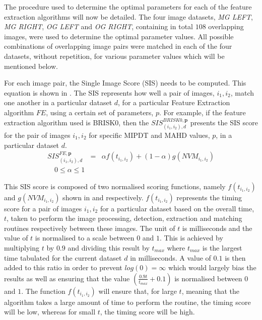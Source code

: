 \documentclass[11pt]{report}
\begin{document}
The procedure used to determine the optimal parameters for each of the feature extraction algorithms will now be detailed. The four image datasets, \textit{MG LEFT}, \textit{MG RIGHT}, \textit{OG LEFT} and \textit{OG RIGHT}, containing in total $108$ overlapping images, were used to determine the optimal parameter values. All possible combinations of overlapping image pairs were matched in each of the four datasets, without repetition, for various parameter values which will be mentioned below. 

For each image pair, the Single Image Score (SIS) needs to be computed. This equation is shown in . The SIS represents how well a pair of images, $i_1, i_2$, match one another in a particular dataset $d$, for a particular Feature Extraction algorithm $FE$, using a certain set of parameters, $p$. For example, if the feature extraction algorithm used is BRISK0, then the $SIS_{(i_1, i_2), d}^{BRISK0, \textbf{p}}$ presents the SIS score for the pair of images $i_1, i_2$ for specific MIPDT and MAHD values, $p$, in a particular dataset $d$. \\

\begin{eqnarray}
SIS_{(i_1, i_2), d}^{FE, \textbf{p}} &=& \alpha f(t_{i_1,i_2}) + (1-\alpha) g(\textit{NVM}_{i_1,i_2})\\ 
\quad 0 \leq \alpha \leq 1 
\label{eqn:optimalParameters}
\end{eqnarray}

This SIS score is composed of two normalised scoring functions, namely $f(t_{i_1, i_2})$ and $g(NVM_{i_1, i_2})$ shown in  and  respectively. $f(t_{i_1, i_2})$ represents the timing score for a pair of images $i_1, i_2$ for a particular dataset based on the overall time, $t$, taken to perform the image processing, detection, extraction and matching routines respectively between these images. The unit of $t$ is milliseconds and the value of $t$ is normalised to a scale between $0$ and $1$. This is achieved by multiplying $t$ by $0.9$ and dividing this result by $t_{max}$ where $t_{max}$ is the largest time tabulated for the current dataset $d$ in milliseconds. A value of $0.1$ is then added to this ratio in order to  prevent $log(0) = \infty$ which would largely bias the results as well as ensuring that the value $(\frac{0.9 t}{t_{max}} + 0.1)$ is normalised between $0$ and $1$. The function $f(t_{i_1, i_2})$ will ensure that, for large $t$, meaning that the algorithm takes a large amount of time to perform the routine, the timing score will be low, whereas for small $t$, the timing score will be high. \\
\end{document}
